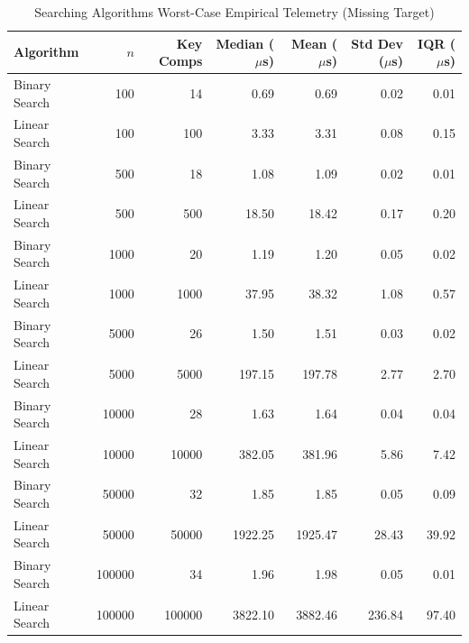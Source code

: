 \begin{table}[htbp]
\centering
\caption{Searching Algorithms Worst-Case Empirical Telemetry (Missing Target)}
\label{tab:search_worst_summary}
\small
\begin{tabular*}{\textwidth}{@{\extracolsep{\fill}}lrrrrrr}
\toprule
\textbf{Algorithm} & $n$ & \textbf{Key Comps} & \textbf{Median ($\mu$s)} & \textbf{Mean ($\mu$s)} & \textbf{Std Dev ($\mu$s)} & \textbf{IQR ($\mu$s)} \\
\midrule
Binary Search & 100 & 14 & 0.69 & 0.69 & 0.02 & 0.01 \\
Linear Search & 100 & 100 & 3.33 & 3.31 & 0.08 & 0.15 \\
Binary Search & 500 & 18 & 1.08 & 1.09 & 0.02 & 0.01 \\
Linear Search & 500 & 500 & 18.50 & 18.42 & 0.17 & 0.20 \\
Binary Search & 1000 & 20 & 1.19 & 1.20 & 0.05 & 0.02 \\
Linear Search & 1000 & 1000 & 37.95 & 38.32 & 1.08 & 0.57 \\
Binary Search & 5000 & 26 & 1.50 & 1.51 & 0.03 & 0.02 \\
Linear Search & 5000 & 5000 & 197.15 & 197.78 & 2.77 & 2.70 \\
Binary Search & 10000 & 28 & 1.63 & 1.64 & 0.04 & 0.04 \\
Linear Search & 10000 & 10000 & 382.05 & 381.96 & 5.86 & 7.42 \\
Binary Search & 50000 & 32 & 1.85 & 1.85 & 0.05 & 0.09 \\
Linear Search & 50000 & 50000 & 1922.25 & 1925.47 & 28.43 & 39.92 \\
Binary Search & 100000 & 34 & 1.96 & 1.98 & 0.05 & 0.01 \\
Linear Search & 100000 & 100000 & 3822.10 & 3882.46 & 236.84 & 97.40 \\
\bottomrule
\end{tabular*}
\end{table}
